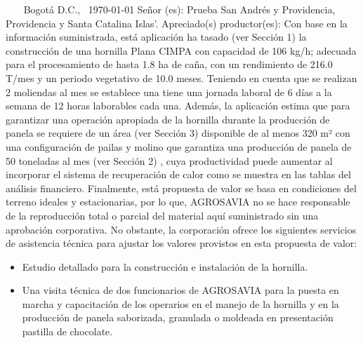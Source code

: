 \documentclass{article}%
\begin{document}
\begin{large}%
\textcolor{white}{ 
HH
}%
\linebreak%
Bogotá D.C., %
\ {\today}%
\newline%
 \newline%
%
\linebreak%
\newline%
Señor (es):%
\newline%
Prueba%
\newline%
San Andrés y Providencia, Providencia y Santa Catalina Islas'.%
\newline%
 \newline%
%
\newline%
Apreciado(s) productor(es):%
\newline%
 \newline%
%
Con base en la información suministrada, está aplicación ha tasado (ver Sección 1) la construcción de una hornilla Plana CIMPA con capacidad de 106 kg/h; adecuada para el procesamiento de hasta 1.8 ha de caña, con un rendimiento de 216.0 T/mes y un periodo vegetativo de 10.0 meses. Teniendo en cuenta que se realizan 2 moliendas al mes se establece una tiene una jornada laboral de 6 días a la semana de 12 horas laborables cada una. \newline%
 Además, la aplicación estima que para garantizar una operación apropiada de la hornilla durante la producción de panela se requiere de un área (ver Sección 3) disponible de al menos 320 m² con una configuración de pailas y molino que garantiza una producción de panela de 50 toneladas al mes (ver Sección 2)%
, cuya productividad puede aumentar al incorporar el sistema de recuperación de calor como se muestra en las tablas del análisis financiero.%
\newline%
 Finalmente, está propuesta de valor se basa en condiciones del terreno ideales y estacionarias, por lo que, AGROSAVIA no se hace responsable de la reproducción total o parcial del material aquí suministrado sin una aprobación corporativa. No obstante, la corporación ofrece los siguientes servicios de asistencia técnica para ajustar los valores provistos en esta propuesta de valor:%
\begin{itemize}%
\item%
Estudio detallado para la construcción e instalación de la hornilla.%
\item%
Una visita técnica de dos funcionarios de AGROSAVIA para la puesta en marcha y capacitación de los operarios en el manejo de la hornilla y en la producción de panela saborizada, granulada o moldeada en presentación pastilla de chocolate.%

\end{itemize}
\end{large}
\end{document}
